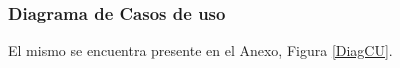     \subsubsection{Diagrama de Casos de uso}
    El mismo se encuentra presente en el Anexo, Figura \ref{DiagCU}.

	
    
    
    
    

    